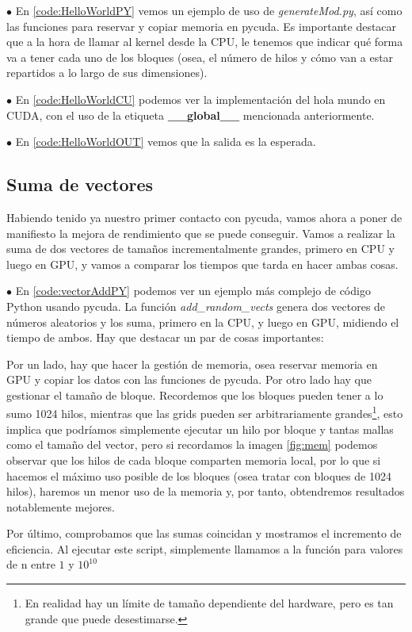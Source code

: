 $\bullet$ En \ref{code:HelloWorldPY} vemos un ejemplo de uso de \textit{generateMod.py}, así como las funciones para reservar y copiar memoria en pycuda. Es importante destacar que a la hora de llamar al kernel desde la CPU, le tenemos que indicar qué forma va a tener cada uno de los bloques (osea, el número de hilos y cómo van a estar repartidos a lo largo de sus dimensiones).

$\bullet$ En \ref{code:HelloWorldCU} podemos ver la implementación del hola mundo en \ac{CUDA}, con el uso de la etiqueta \textbf{\_\_global\_\_} mencionada anteriormente.

$\bullet$ En \ref{code:HelloWorldOUT} vemos que la salida es la esperada.

\subsection{Suma de vectores}
Habiendo tenido ya nuestro primer contacto con pycuda, vamos ahora a poner de manifiesto la mejora de rendimiento que se puede conseguir. Vamos a realizar la suma de dos vectores de tamaños incrementalmente grandes, primero en \ac{CPU} y luego en \ac{GPU}, y vamos a comparar los tiempos que tarda en hacer ambas cosas.

$\bullet$ En \ref{code:vectorAddPY} podemos ver un ejemplo más complejo de código Python usando pycuda. La función \textit{add\_random\_vects} genera dos vectores de números aleatorios y los suma, primero en la \ac{CPU}, y luego en \ac{GPU}, midiendo el tiempo de ambos. Hay que destacar un par de cosas importantes:

Por un lado, hay que hacer la gestión de memoria, osea reservar memoria en \ac{GPU} y copiar los datos con las funciones de pycuda. Por otro lado hay que gestionar el tamaño de bloque. Recordemos que los bloques pueden tener a lo sumo 1024 hilos, mientras que las grids pueden ser arbitrariamente grandes\footnote{En realidad hay un límite de tamaño dependiente del hardware, pero es tan grande que puede desestimarse.}, esto implica que podríamos simplemente ejecutar un hilo por bloque y tantas mallas como el tamaño del vector, pero si recordamos la imagen \ref{fig:mem} podemos observar que los hilos de cada bloque comparten memoria local, por lo que si hacemos el máximo uso posible de los bloques (osea tratar con bloques de 1024 hilos), haremos un menor uso de la memoria y, por tanto, obtendremos resultados notablemente mejores.

Por último, comprobamos que las sumas coincidan y mostramos el incremento de eficiencia. Al ejecutar este script, simplemente llamamos a la función para valores de n entre $1$ y $10^{10}$

